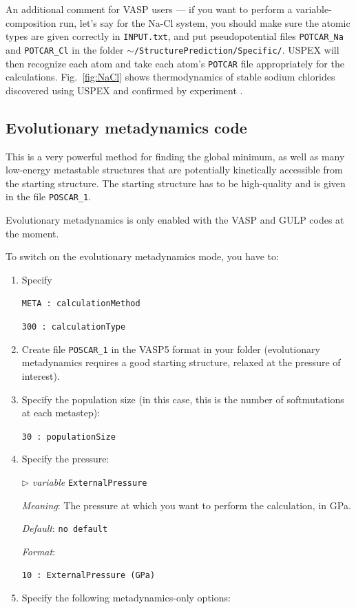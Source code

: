 \documentclass[12pt]{article}
\newcommand{\file}[1]{\texttt{#1}}
\newcommand{\paramacro}[6]{
\vspace{0.5cm}
$\triangleright$ \emph{variable} {\color{blue} \texttt{#1}}

\emph{Meaning}: {#2}

{#3}

\emph{Default}: \texttt{#4}

\emph{Format}:

{\addtolength{\leftskip}{10mm} 
\texttt{#5}
\par}


{\small #6}

}
\begin{document}
An additional comment for VASP users --- if you want to perform a
variable-composition run, let's say for the Na-Cl system, you should make sure
the atomic types are given correctly in \file{INPUT.txt}, and put
pseudopotential files \file{POTCAR\_Na} and \file{POTCAR\_Cl} in the folder
\file{$\sim$/StructurePrediction/Specific/}. USPEX will then recognize each atom
and take each atom's \file{POTCAR} file appropriately for the calculations.
Fig.~\ref{fig:NaCl} shows thermodynamics of stable sodium chlorides discovered
using USPEX and confirmed by experiment \cite{Zhang2013}.


\subsection{Evolutionary metadynamics code} \label{metadynamics}

This is a very powerful method for finding the global minimum, as well as many
low-energy metastable structures that are potentially kinetically accessible
from the starting structure. The starting structure has to be high-quality and
is given in the file \file{POSCAR\_1}.

Evolutionary metadynamics is only enabled with the VASP and GULP codes at the
moment.

To switch on the evolutionary metadynamics mode, you have to:

\begin{enumerate}
\item Specify

\texttt{META  : calculationMethod}

\texttt{300   : calculationType}

\item Create file \file{POSCAR\_1} in the VASP5 format in your folder
(evolutionary metadynamics requires a good starting structure, relaxed at the
pressure of interest).

\item Specify the population size (in this case, this is the number of
softmutations at each metastep):

\texttt{30    : populationSize}

\item Specify the pressure:

\paramacro{ExternalPressure}{The pressure at which you want to perform the
calculation, in GPa.}{}{\rm no default}{10  : ExternalPressure (GPa)}{}

\item Specify the following metadynamics-only options:
\end{enumerate}
\end{document}
